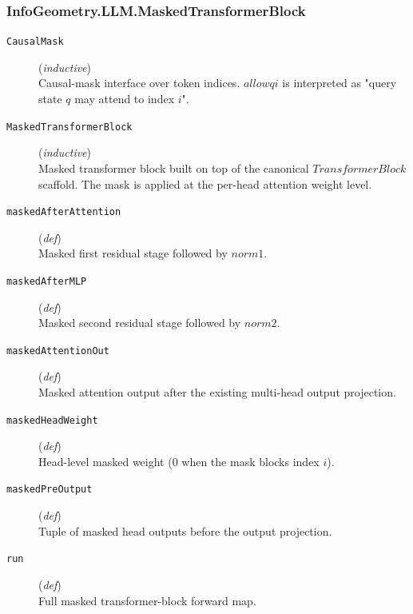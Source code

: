 \documentclass[11pt,a4paper]{article}
\begin{document}
\subsubsection*{InfoGeometry.LLM.MaskedTransformerBlock}
\begin{description}
  \item[\texttt{CausalMask}] (\textit{inductive}) \\ Causal-mask interface over token indices. 
$allow q i$ is interpreted as "query state $q$ may attend to index $i$".
  \item[\texttt{MaskedTransformerBlock}] (\textit{inductive}) \\ Masked transformer block built on top of the canonical $TransformerBlock$ scaffold. 
The mask is applied at the per-head attention weight level.
  \item[\texttt{maskedAfterAttention}] (\textit{def}) \\ Masked first residual stage followed by $norm1$.
  \item[\texttt{maskedAfterMLP}] (\textit{def}) \\ Masked second residual stage followed by $norm2$.
  \item[\texttt{maskedAttentionOut}] (\textit{def}) \\ Masked attention output after the existing multi-head output projection.
  \item[\texttt{maskedHeadWeight}] (\textit{def}) \\ Head-level masked weight ($0$ when the mask blocks index $i$).
  \item[\texttt{maskedPreOutput}] (\textit{def}) \\ Tuple of masked head outputs before the output projection.
  \item[\texttt{run}] (\textit{def}) \\ Full masked transformer-block forward map.
\end{description}
\end{document}
